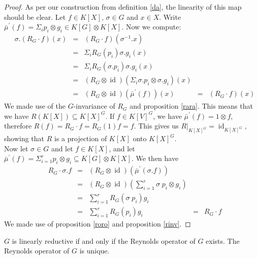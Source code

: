 \begin{proof}
  As per our construction from definition \ref{da}, the linearity of this map should be clear.
  Let $f \in K[X]$, $\sigma \in G$ and $x \in X$.
  Write $\bar{\mu}^\prime (f) = \Sigma_i p_i \otimes g_i \in K[G] \otimes K[X] $.
  Now we compute:
  \begin{equation}
    \begin{aligned}
      &\sigma. \left( R_G \cdot f \right) (x)
      &=& \left( R_G \cdot f \right) (\sigma^{-1}.x)\\
      &&=& \Sigma_i R_G \left( p_i \right)  \sigma.g_i \left(  x \right) \\
      &&=& \Sigma_i R_G (\sigma.p_i)  \sigma.g_i (x)\\
      &&=& \left( R_G \otimes \operatorname{id} \right) \left( \Sigma_i \sigma.p_i \otimes \sigma.g_i \right) (x)\\
      &&=& (R_G \otimes \operatorname{id}) (\bar{\mu}^\prime (f)) (x)
      &=& (R_G \cdot f) (x)
    \end{aligned}
  \end{equation}
  We made use of the $G$-invariance of $R_G$ and proposition \ref{rara}.
  This means that we have $R(K[X]) \subseteq K[X]^G$.
  If $f \in K[V]^G$, we have $\bar{\mu}^\prime (f) = 1 \otimes f$, therefore $R(f) = R_G \cdot f = R_G (1)f = f$.
  This gives us $\left. R \right|_{K[X]^G} = \operatorname{id}_{K[X]^G}$, showing that $R$ is a projection of $K[X]$ onto $K[X]^G$.\\
  Now let $\sigma \in G$ and let $ f \in K[X]$, and let $\bar{\mu}^\prime(f) = \Sigma_{i=1}^r p_i \otimes g_i \subseteq K[G] \otimes K[X]$.
  We then have
  \begin{equation}
    \begin{aligned}
      &R_G \cdot \sigma.f
      &=& (R_G \otimes \operatorname{id}) \left(\bar{\mu}^\prime(\sigma.f)\right)\\
      &&=& (R_G \otimes \operatorname{id}) \left(\sum_{i=1}^r \sigma \dot{\phantom{.}}p_i \otimes g_i \right)\\
      &&=& \sum_{i=1}^r R_G(\sigma\dot{\phantom{.}}p_i)g_i\\
      &&=& \sum_{i=1}^r R_G(p_i)g_i
      &=& R_G \cdot f
    \end{aligned}
  \end{equation}
We made use of proposition \ref{roro} and proposition \ref{rinv}.
\end{proof}

\begin{corollary}
  $G$ is linearly reductive if and only if the Reynolds operator of $G$ exists.
  The Reynolds operator of $G$ is unique.
\end{corollary}
